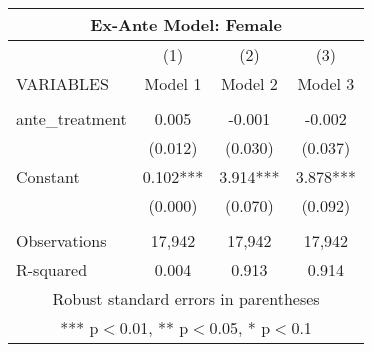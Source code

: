 \begin{tabular}{lccc}
\multicolumn{4}{c}{Ex-Ante Model: Female} \\ \hline
 & (1) & (2) & (3) \\
VARIABLES & Model 1 & Model 2 & Model 3 \\ \hline
 &  &  &  \\
ante\_treatment & 0.005 & -0.001 & -0.002 \\
 & (0.012) & (0.030) & (0.037) \\
Constant & 0.102*** & 3.914*** & 3.878*** \\
 & (0.000) & (0.070) & (0.092) \\
 &  &  &  \\
Observations & 17,942 & 17,942 & 17,942 \\
 R-squared & 0.004 & 0.913 & 0.914 \\ \hline
\multicolumn{4}{c}{ Robust standard errors in parentheses} \\
\multicolumn{4}{c}{ *** p$<$0.01, ** p$<$0.05, * p$<$0.1} \\
\end{tabular}
